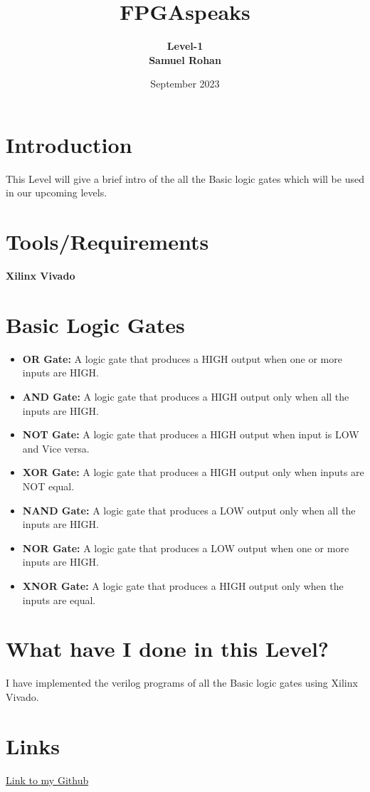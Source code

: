 \documentclass{article}
\title{\huge{\textbf{FPGAspeaks}}}
\author{\textbf{Level-1}\\  \textbf{Samuel Rohan}}
\date{September 2023}
\begin{document}
\maketitle
\tableofcontents
\section{Introduction}
This Level will give a brief intro of the all the Basic logic gates which will be used in our upcoming levels.
\section{Tools/Requirements}
\textbf{Xilinx Vivado}
\section{Basic Logic Gates}
\begin{itemize}
    \item \textbf{OR Gate:}
    A logic gate that produces a HIGH output when one or more inputs are HIGH.
    \item \textbf{AND Gate:}
    A logic gate that produces a HIGH output only when all the inputs are HIGH.
    \item \textbf{NOT Gate:}
    A logic gate that produces a HIGH output when input is LOW and Vice versa.
    \item \textbf{XOR Gate:}
    A logic gate that produces a HIGH output only when inputs are NOT equal.
    \item \textbf{NAND Gate:}
    A logic gate that produces a LOW output only when all the inputs are HIGH.
    \item \textbf{NOR Gate:}
    A logic gate that produces a LOW output when one or more inputs are HIGH.
    \item \textbf{XNOR Gate:}
    A logic gate that produces a HIGH output only when the inputs are equal.
\end{itemize}
\section{What have I done in this Level?}
I have implemented the verilog programs of all the Basic logic gates using Xilinx 
Vivado.
\section{Links}
\href{https://github.com/rohann-9/FPGAspeaks/tree/main/Level-1}{Link to my Github}
\end{document}
